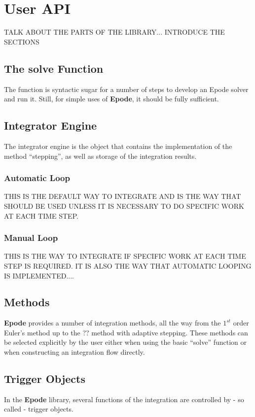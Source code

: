\documentclass[letterpaper,10pt]{book}
\newcommand{\identifier}[1]{{\color{blue!60}#1}}
\newcommand{\epode}[0]{\textbf{Epode}}
\begin{document}
  \chapter{User API}
    TALK ABOUT THE PARTS OF THE LIBRARY... INTRODUCE THE SECTIONS

    \section{The \identifier{solve} Function}
      The function  is syntactic sugar for a number of steps to develop an Epode solver and run it.  Still, for simple uses of \epode{}, it should be fully sufficient.
      
    \section{Integrator Engine}
      The integrator engine is the object that contains the implementation of the method ``stepping'', as well as storage of the integration results.
      \subsection{Automatic Loop}
      	THIS IS THE DEFAULT WAY TO INTEGRATE AND IS THE WAY THAT SHOULD BE USED UNLESS IT IS NECESSARY TO DO SPECIFIC WORK AT EACH TIME STEP.
	\subsection{Manual Loop}
	THIS IS THE WAY TO INTEGRATE IF SPECIFIC WORK AT EACH TIME STEP IS REQUIRED.  IT IS ALSO THE WAY THAT AUTOMATIC LOOPING IS IMPLEMENTED....
      
    \section{Methods}
      \epode{} provides a number of integration methods, all the way from the $1^{st}$ order Euler's method up to the ?? method with adaptive stepping.  These methods can be selected explicitly by the user either when using the basic ``solve'' function or when constructing an integration flow directly.
      
    \section{Trigger Objects}
      In the \epode{} library, several functions of the integration are controlled by - so called - trigger objects.
      
\end{document}
